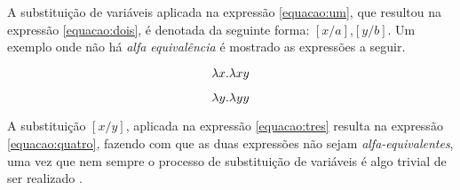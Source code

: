 A substituição de variáveis aplicada na expressão \ref{equacao:um}, que resultou na expressão \ref{equacao:dois}, é denotada da seguinte forma: $[x/a]$,$[y/b]$. Um exemplo onde não há \emph{alfa equivalência}  é mostrado as expressões a seguir.

\begin{equation}
	\label{equacao:tres}
	\lambda\\x.\lambda\\xy
\end{equation}

\begin{equation}
	\label{equacao:quatro}
	\lambda\\y.\lambda\\yy
\end{equation}

A substituição $[x/y]$, aplicada na expressão \ref{equacao:tres} resulta na expressão \ref{equacao:quatro}, fazendo com que as duas expressões não sejam \textit{alfa-equivalentes}, uma vez que nem sempre o processo de substituição de variáveis é algo trivial de ser realizado \cite{pierce2002types}.